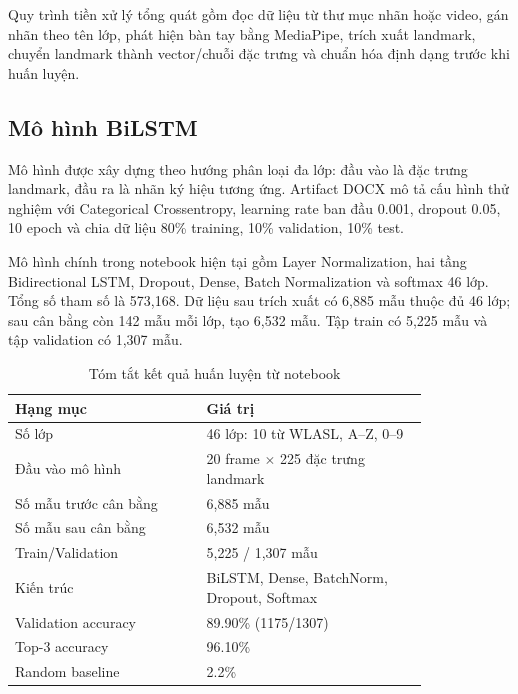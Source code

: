 \documentclass[conference]{IEEEtran}
\begin{document}
Quy trình tiền xử lý tổng quát gồm đọc dữ liệu từ thư mục nhãn hoặc video, gán nhãn theo tên lớp, phát hiện bàn tay bằng MediaPipe, trích xuất landmark, chuyển landmark thành vector/chuỗi đặc trưng và chuẩn hóa định dạng trước khi huấn luyện.

\subsection{Mô hình BiLSTM}
Mô hình được xây dựng theo hướng phân loại đa lớp: đầu vào là đặc trưng landmark, đầu ra là nhãn ký hiệu tương ứng. Artifact DOCX mô tả cấu hình thử nghiệm với Categorical Crossentropy, learning rate ban đầu 0.001, dropout 0.05, 10 epoch và chia dữ liệu 80\% training, 10\% validation, 10\% test.

Mô hình chính trong notebook hiện tại gồm Layer Normalization, hai tầng Bidirectional LSTM, Dropout, Dense, Batch Normalization và softmax 46 lớp. Tổng số tham số là 573,168. Dữ liệu sau trích xuất có 6,885 mẫu thuộc đủ 46 lớp; sau cân bằng còn 142 mẫu mỗi lớp, tạo 6,532 mẫu. Tập train có 5,225 mẫu và tập validation có 1,307 mẫu.

\begin{table}[htbp]
\caption{Tóm tắt kết quả huấn luyện từ notebook}
\begin{center}
\footnotesize
\begin{tabular}{|p{0.38\linewidth}|p{0.44\linewidth}|}
\hline
\textbf{Hạng mục} & \textbf{Giá trị} \\
\hline
Số lớp & 46 lớp: 10 từ WLASL, A--Z, 0--9 \\
\hline
Đầu vào mô hình & 20 frame $\times$ 225 đặc trưng landmark \\
\hline
Số mẫu trước cân bằng & 6,885 mẫu \\
\hline
Số mẫu sau cân bằng & 6,532 mẫu \\
\hline
Train/Validation & 5,225 / 1,307 mẫu \\
\hline
Kiến trúc & BiLSTM, Dense, BatchNorm, Dropout, Softmax \\
\hline
Validation accuracy & 89.90\% (1175/1307) \\
\hline
Top-3 accuracy & 96.10\% \\
\hline
Random baseline & 2.2\% \\
\hline
\end{tabular}
\label{tab:model}
\end{center}
\end{table}
\end{document}
